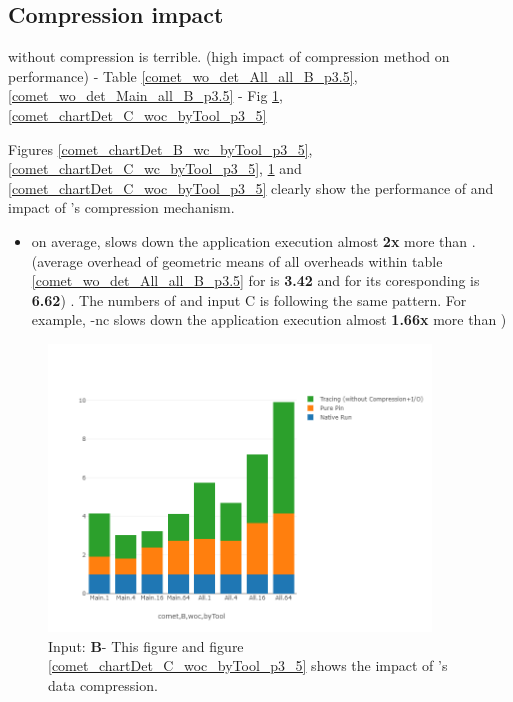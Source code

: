 \subsection{Compression impact} 
\label{subsec:compact}
\parlot without compression is terrible. (high impact of compression method on performance)
 - Table \ref{comet_wo_det_All_all_B_p3.5}, \ref{comet_wo_det_Main_all_B_p3.5}
   - Fig \ref{comet_chartDet_B_woc_byTool_p3_5}, \ref{comet_chartDet_C_woc_byTool_p3_5}
   
Figures \ref{comet_chartDet_B_wc_byTool_p3_5}, \ref{comet_chartDet_C_wc_byTool_p3_5}, \ref{comet_chartDet_B_woc_byTool_p3_5} and \ref{comet_chartDet_C_woc_byTool_p3_5} clearly show the performance of \parlot and impact of \parlot 's compression mechanism.
	
\begin{itemize}
\item on average, \parlotnc slows down the application execution almost \textbf{2x} more than \parlota. (average overhead of geometric means of all overheads within table  \ref{comet_wo_det_All_all_B_p3.5} for \parlota is \textbf{3.42} and for its coresponding \parlotnc is \textbf{6.62}) . The numbers of \parlotm and input C is following the same pattern. For example, \parlot-nc slows down the application execution almost \textbf{1.66x} more than \parlotm)
\end{itemize}

\begin{figure}[!t]
\centering
\includegraphics[width=4in]{figs.comet/comet_chartDet_B_woc_byTool_p3_5.png}
\caption{ Input: \textbf{B}- This figure and figure \ref{comet_chartDet_C_woc_byTool_p3_5} shows the impact of \parlot 's data compression.
}
\label{comet_chartDet_B_woc_byTool_p3_5}
\end{figure}

